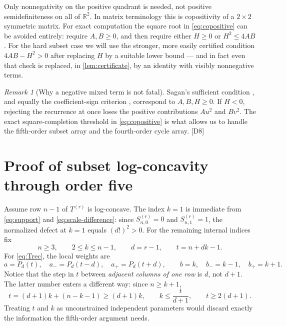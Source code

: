 \documentclass[11pt,a4paper]{article}
\numberwithin{equation}{section}
\theoremstyle{definition}
\theoremstyle{remark}
\newtheorem{remark}[remark]{Remark}
\newcommand{\R}{\mathbb R}
\newcommand{\Snum}[3]{S^{(#1)}_{#2,#3}}
\newcommand{\dup}[1]{{\small\textsf{\color{MutedInk}[#1]}}}
\begin{document}
Only nonnegativity on the positive quadrant is needed, not positive
semidefiniteness on all of $\R^2$. In matrix terminology this is
copositivity of a $2\times2$ symmetric matrix. For exact computation the
square root in \eqref{eq:copositive} can be avoided entirely: require
$A,B\ge0$, and then require either $H\ge0$ or $H^2\le4AB$. For the hard
subset case we will use the stronger, more easily certified condition
$4AB-H^2>0$ after replacing $H$ by a suitable lower bound --- and in fact
even that check is replaced, in \cref{lem:certificate}, by an identity
with visibly nonnegative terms.

\begin{remark}[Why a negative mixed term is not fatal]\label{rem:sagan}
Sagan's sufficient condition \cite[Theorem~1]{Sagan}, and equally the
coefficient-sign criterion \cite[Theorem~1.2]{Shankar}, correspond to
$A,B,H\ge0$. If $H<0$, rejecting the recurrence at once loses the positive
contributions $Au^2$ and $Bv^2$. The exact square-completion threshold in
\eqref{eq:copositive} is what allows us to handle the fifth-order subset
array and the fourth-order cycle array. \dup{D8}
\end{remark}

\section{Proof of subset log-concavity through order five}\label{sec:subset-proof}

Assume row $n-1$ of $T^{(r)}$ is log-concave. The index $k=1$ is immediate
from \eqref{eq:support} and \eqref{eq:scale-difference}: since
$\Snum r n0=0$ and $\Snum r n1=1$, the normalized defect at $k=1$ equals
$(d!)^2>0$. For the remaining internal indices fix
\begin{equation}\label{eq:domain}
 n\ge3,\qquad 2\le k\le n-1,\qquad d=r-1,\qquad t=n+dk-1.
\end{equation}
For \eqref{eq:Trec}, the local weights are
\[
 a=P_d(t),\quad a_-=P_d(t-d),\quad a_+=P_d(t+d),\qquad
 b=k,\quad b_-=k-1,\quad b_+=k+1.
\]
Notice that the step in $t$ between \emph{adjacent columns of one row} is
$d$, not $d+1$. The latter number enters a different way: since $n\ge k+1$,
\begin{equation}\label{eq:triangular-bound}
 t=(d+1)k+(n-k-1)\ge(d+1)k,\qquad k\le\frac{t}{d+1},\qquad t\ge2(d+1).
\end{equation}
Treating $t$ and $k$ as unconstrained independent parameters would discard
exactly the information the fifth-order argument needs.
\end{document}
